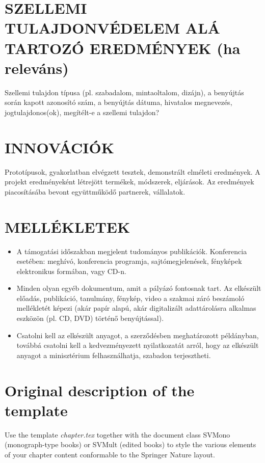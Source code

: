 \documentclass[graybox,envcountchap,sectrefs]{svmono}
\begin{document}
\section{SZELLEMI TULAJDONVÉDELEM ALÁ TARTOZÓ EREDMÉNYEK (ha releváns)}
Szellemi tulajdon típusa (pl. szabadalom, mintaoltalom, dizájn), a benyújtás során kapott azonosító szám, a benyújtás dátuma, hivatalos megnevezés, jogtulajdonos(ok), megítélt-e a szellemi tulajdon?

\section{INNOVÁCIÓK}
Prototípusok, gyakorlatban elvégzett tesztek, demonstrált elméleti eredmények.
A projekt eredményeként létrejött termékek, módszerek, eljárások.
Az eredmények piacosításába bevont együttműködő partnerek, vállalatok.

\section*{MELLÉKLETEK}


\begin{itemize}
	\item A támogatási időszakban megjelent tudományos publikációk. Konferencia esetében: meghívó, konferencia programja, sajtómegjelenések, fényképek elektronikus formában, vagy CD-n.
	\item Minden olyan egyéb dokumentum, amit a pályázó fontosnak tart.	
	Az elkészült előadás, publikáció, tanulmány, fénykép, video a szakmai záró beszámoló mellékletét képezi (akár papír alapú, akár digitalizált adattárolásra alkalmas eszközön (pl. CD, DVD) történő benyújtással).
	\item Csatolni kell az elkészült anyagot, a szerződésben meghatározott példányban, továbbá csatolni kell a kedvezményezett nyilatkozatát arról, hogy az elkészült anyagot a minisztérium felhasználhatja, szabadon terjesztheti.
\end{itemize}



\eject

\section{Original description of the template}

Use the template \emph{chapter.tex} together with the document class SVMono (monograph-type books) or SVMult (edited books) to style the various elements of your chapter content conformable to the Springer Nature layout.
\end{document}
